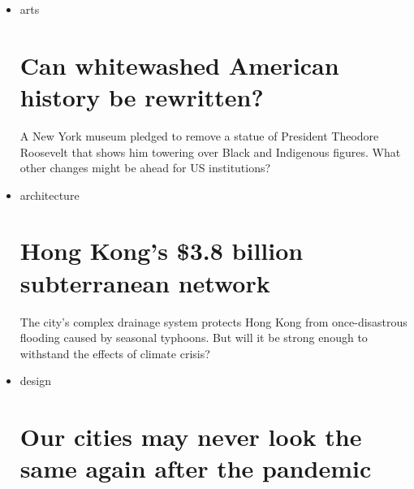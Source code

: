 \begin{itemize}
\item
  \href{/style/arts}{}

  arts

  \href{/style/article/natural-history-museum-whitewashing-monuments-statues-trnd/index.html}{}

  \hypertarget{can-whitewashed-american-history-be-rewritten-1}{%
  \section{Can whitewashed American history be
  rewritten?}\label{can-whitewashed-american-history-be-rewritten-1}}

  \href{/style/article/natural-history-museum-whitewashing-monuments-statues-trnd/index.html}{}

  A New York museum pledged to remove a statue of President Theodore
  Roosevelt that shows him towering over Black and Indigenous figures.
  What other changes might be ahead for US institutions?
\item
  \href{/style/architecture}{}

  architecture

  \href{/style/article/hong-kong-tunnels-climate-crisis-intl-hnk-dst/index.html}{}

  \hypertarget{hong-kongs-38-billion-subterranean-network}{%
  \section{Hong Kong's \$3.8 billion subterranean
  network}\label{hong-kongs-38-billion-subterranean-network}}

  \href{/style/article/hong-kong-tunnels-climate-crisis-intl-hnk-dst/index.html}{}

  The city's complex drainage system protects Hong Kong from
  once-disastrous flooding caused by seasonal typhoons. But will it be
  strong enough to withstand the effects of climate crisis?
\item
  \href{/style/design}{}

  design

  \href{/style/article/cities-design-coronavirus/index.html}{}

  \hypertarget{our-cities-may-never-look-the-same-again-after-the-pandemic}{%
  \section{Our cities may never look the same again after the
  pandemic}\label{our-cities-may-never-look-the-same-again-after-the-pandemic}}


\end{itemize}
